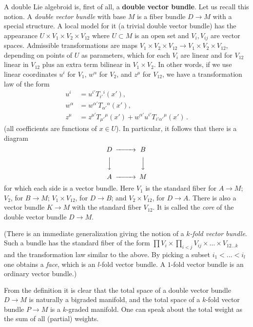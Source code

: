 \documentclass[12pt,reqno,a4paper]{amsart}
\theoremstyle{definition}
\begin{document}
A double Lie algebroid    is, first of all,  a \textbf{double vector bundle}. Let us recall this notion. A \textit{double vector bundle} with base $M$ is a fiber bundle  $D\to M$ with a special structure. A local model for it (a trivial double vector bundle) has the appearance $U\times V_1\times V_2\times V_{12}$ where $U\subset M$ is an open set and $V_i, V_{ij}$ are vector spaces. Admissible transformations are maps $V_1\times V_2\times V_{12}\to V_1\times V_2\times V_{12}$, depending on points of $U$ as  parameters,  which for each $V_i$ are linear  and for $V_{12}$ linear in $V_{12}$ plus an extra  term bilinear in $V_1\times V_2$. In other words, if we use linear coordinates $u^i$ for $V_1$, $w^{\alpha}$ for $V_2$, and $z^{\mu}$ for $V_{12}$, we have a transformation law of the form
\begin{align}
    u^i&=u^{i'}T_{i'}{}^{i}(x'),  \label{eq.lawforu}\\
    w^{\alpha}&=w^{{\alpha}'}T_{{\alpha}'}{}^{\alpha}(x'), \label{eq.lawforw} \\
    z^{\mu}&=z^{\mu'}T_{\mu'}{}^{\mu}(x')+w^{{\alpha}'}u^{i'}T_{i'{\alpha}'}{}^{\mu}(x')\,.\label{eq.lawforz}
\end{align}
(all coefficients are functions of $x\in U$). In particular, it follows that there is a diagram
\begin{equation} \label{eq.dvb2}
    \begin{CD} D@>>> B\\
                @VVV  @VVV \\
                A@>>>M
    \end{CD}
\end{equation}
for which each side is a vector bundle. Here $V_1$ is the standard fiber for $A\to M$; $V_2$, for $B\to M$; $V_1\times V_{12}$, for $D\to B$; and $V_2\times V_{12}$, for $D\to A$. There is also a vector bundle $K\to M$ with the standard fiber $V_{12}$. It is called the \textit{core} of the double vector bundle $D\to M$.

(There is an immediate generalization giving the notion of a \textit{$k$-fold vector bundle}. Such a bundle has the standard fiber of the form $\prod V_i\times \prod_{i<j}V_{ij}\times \ldots \times V_{12\ldots k}$ and the transformation law similar to the above. By picking a subset $i_1<\ldots<i_l$ one obtains a \textit{face}, which is an $l$-fold vector bundle. A $1$-fold vector bundle is an ordinary vector bundle.)

From the definition it is clear that the total space of a double
vector bundle $D\to M$  is naturally a bigraded manifold, and the
total space of a  $k$-fold vector bundle $P\to M$ is a $k$-graded
manifold. One can speak about the total weight as the sum of all
(partial) weights.
\end{document}
